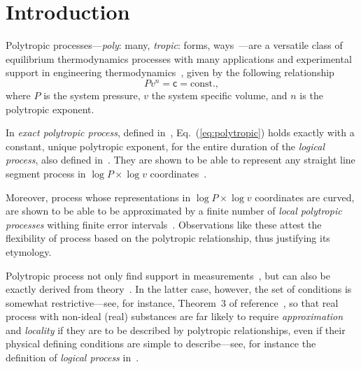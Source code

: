 \section{Introduction}

    Polytropic        processes---\emph{poly}:        many,        \emph{tropic}:         forms,
    ways~\cite{2020-NaaktgeborenC-engrXiv}---are a versatile class of equilibrium thermodynamics
    processes   with   many   applications   and    experimental    support    in    engineering
    thermodynamics~\cite{2002-MoranMJ+ShapiroHN-LTC,                 2013-CengelYA+BolesMA-AMGH,
    2015-KroosKA+PotterMC-Cengage,  1986-JonesJB+HawkinsGA-Wiley},  given   by   the   following
    relationship
    \begin{equation}
        Pv^n = \mathsf{c} = \mbox{const.},
        \label{eq:polytropic}
    \end{equation}
    \noindent where $P$ is the system pressure, $v$ the system specific volume, and $n$  is  the
    polytropic exponent.

    In   \emph{exact   polytropic   process},   defined    in~\cite{2020-NaaktgeborenC-engrXiv},
    Eq.~(\ref{eq:polytropic}) holds exactly with a constant, unique polytropic exponent, for the
    entire     duration     of      the      \emph{logical      process},      also      defined
    in~\cite{2020-NaaktgeborenC-engrXiv}. They are shown to be able to  represent  any  straight
    line      segment      process       in       $\log       P       \times       \log       v$
    coordinates~\cite{2020-NaaktgeborenC-engrXiv}.

    Moreover, process whose representations in $\log P \times \log v$  coordinates  are  curved,
    are shown to be able to be  approximated  by  a  finite  number  of  \emph{local  polytropic
    processes} withing finite  error  intervals~\cite{2020-NaaktgeborenC-engrXiv}.  Observations
    like these attest the flexibility of process based  on  the  polytropic  relationship,  thus
    justifying its etymology.

    Polytropic process not only find support  in  measurements~\cite{2013-CengelYA+BolesMA-AMGH,
    2002-MoranMJ+ShapiroHN-LTC,  1985-WylenG-Wiley},  but  can  also  be  exactly  derived  from
    theory~\cite{2012-ChristiansJ-IntJMechEngEduc, 2020-NaaktgeborenC-engrXiv}.  In  the  latter
    case, however, the set of conditions is somewhat restrictive---see, for instance,  Theorem~3
    of reference~\cite{2020-NaaktgeborenC-engrXiv}, so that real process with  non-ideal  (real)
    substances are far likely to require \emph{approximation} and \emph{locality} if they are to
    be described by polytropic relationships, even if their  physical  defining  conditions  are
    simple  to  describe---see,  for  instance  the   definition   of   \emph{logical   process}
    in~\cite{2020-NaaktgeborenC-engrXiv}.

